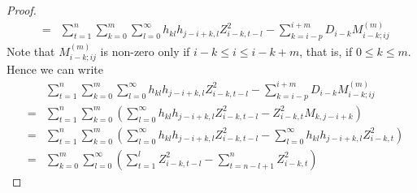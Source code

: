 \documentclass{article}
\begin{document}
\begin{proof}
\begin{eqnarray*}
    &=& \sum_{t=1}^n \sum_{k=0}^m \sum_{l=0}^\infty h_{kl}h_{j-i+k,l}
    Z_{i-k, t-l}^2 - \sum_{k=i-p}^{i+m} D_{i-k} M_{i-k; ij}^{(m)}
  \end{eqnarray*}
  Note that $M_{i-k; ij}^{(m)}$ is non-zero only if $i-k \leq i \leq
  i-k+m$, that is, if $0 \leq k \leq m$. Hence we can write
  \begin{eqnarray*}
    && \sum_{t=1}^n \sum_{k=0}^m \sum_{l=0}^\infty h_{kl}h_{j-i+k,l}
    Z_{i-k, t-l}^2 - \sum_{k=i-p}^{i+m} D_{i-k} M_{i-k; ij}^{(m)} \\
    &=& \sum_{t=1}^n \sum_{k=0}^m \left(
      \sum_{l=0}^\infty h_{kl}h_{j-i+k,l} Z_{i-k, t-l}^2 - Z_{i-k, t}^2 M_{k,
        j-i+k} \right) \\
    &=& \sum_{t=1}^n \sum_{k=0}^m \left(
      \sum_{l=0}^\infty h_{kl}h_{j-i+k,l} Z_{i-k, t-l}^2 - \sum_{l=0}^{\infty}
      h_{kl} h_{j-i+k, l} Z_{i-k, t}^2  \right) \\
    &=& \sum_{k=0}^m \sum_{l=0}^\infty \left(
      \sum_{t=1}^l Z_{i-k, t-l}^2 - \sum_{t=n-l+1}^n Z_{i-k, t}^2
    \right)
  \end{eqnarray*}
\end{proof}



\end{document}
